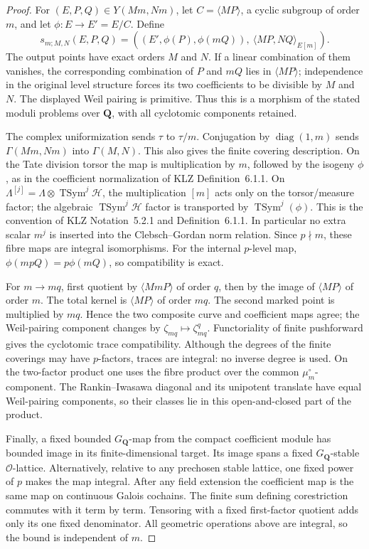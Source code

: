\begin{proof}
For \((E,P,Q)\in Y(Mm,Nm)\), let
\(C=\langle MP\rangle\), a cyclic subgroup of order \(m\), and let
\(\phi:E\to E'=E/C\).  Define
\[
 s_{m;M,N}(E,P,Q)=
 \left((E',\phi(P),\phi(mQ)),\
       \langle MP,NQ\rangle_{E[m]}\right).
\]
The output points have exact orders \(M\) and \(N\).
If a linear combination of them vanishes, the corresponding
combination of \(P\) and \(mQ\) lies in \(\langle MP\rangle\);
independence in the original level structure forces its two
coefficients to be divisible by \(M\) and \(N\).
The displayed Weil pairing is primitive.  Thus this is a morphism
of the stated moduli problems over \(\mathbf Q\), with all
cyclotomic components retained.

The complex uniformization sends \(\tau\) to \(\tau/m\).
Conjugation by \(\operatorname{diag}(1,m)\) sends
\(\Gamma(Mm,Nm)\) into \(\Gamma(M,N)\).
This also gives the finite covering description.  On the
Tate division torsor the map is multiplication by \(m\),
followed by the isogeny \(\phi\), as in the coefficient
normalization of KLZ Definition~6.1.1.
On \(\Lambda^{[j]}=\Lambda\otimes\operatorname{TSym}^j\mathcal H\),
the multiplication \([m]\) acts only on the torsor/measure
factor; the algebraic \(\operatorname{TSym}^j\mathcal H\)
factor is transported by \(\operatorname{TSym}^j(\phi)\).
This is the convention of KLZ Notation~5.2.1 and
Definition~6.1.1.  In particular no extra scalar \(m^j\)
is inserted into the Clebsch--Gordan norm relation.
Since \(p\nmid m\), these fibre maps are integral
isomorphisms.
For the internal \(p\)-level map,
\(\phi(mpQ)=p\phi(mQ)\), so compatibility is exact.

For \(m\to mq\), first quotient by
\(\langle MmP\rangle\) of order \(q\), then by the
image of \(\langle MP\rangle\) of order \(m\).
The total kernel is \(\langle MP\rangle\) of order \(mq\).
The second marked point is multiplied by \(mq\).
Hence the two composite curve and coefficient maps agree;
the Weil-pairing component changes by
\(\zeta_{mq}\mapsto\zeta_{mq}^{q}\).
Functoriality of finite pushforward gives the cyclotomic
trace compatibility.  Although the degrees of the finite
coverings may have \(p\)-factors, traces are integral:
no inverse degree is used.  On the two-factor product
one uses the fibre product over the common
\(\mu_m^\circ\)-component.  The Rankin--Iwasawa diagonal
and its unipotent translate have equal Weil-pairing
components, so their classes lie in this open-and-closed
part of the product.

Finally, a fixed bounded \(G_{\mathbf Q}\)-map from the
compact coefficient module has bounded image in its
finite-dimensional target.  Its image spans a fixed
\(G_{\mathbf Q}\)-stable \(\mathcal O\)-lattice.
Alternatively, relative to any prechosen stable lattice,
one fixed power of \(p\) makes the map integral.
After any field extension the coefficient map is the
same map on continuous Galois cochains.  The finite sum
defining corestriction commutes with it term by term.
Tensoring with a fixed first-factor quotient adds only
its one fixed denominator.  All geometric operations
above are integral, so the bound is independent of \(m\).


\end{proof}
